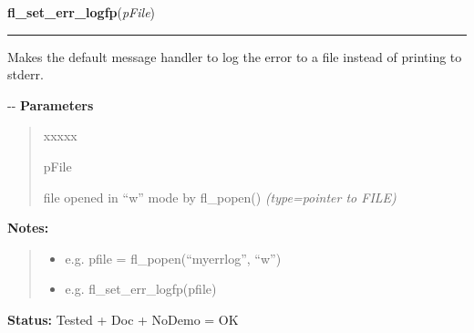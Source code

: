 \hspace{.8\funcindent}\begin{boxedminipage}{\funcwidth}

    \raggedright \textbf{fl\_set\_err\_logfp}(\textit{pFile})

    \vspace{-1.5ex}

    \rule{\textwidth}{0.5\fboxrule}
\setlength{\parskip}{2ex}

Makes the default message handler to log the error to a file instead of
printing to stderr.

-{}-
\setlength{\parskip}{1ex}
      \textbf{Parameters}
      \vspace{-1ex}

      \begin{quote}
        \begin{Ventry}{xxxxx}

          \item[pFile]


file opened in ``w'' mode by fl\_popen()
            {\it (type=pointer to FILE)}

        \end{Ventry}

      \end{quote}

\textbf{Notes:}
\begin{quote}
  \begin{itemize}

  \item
    \setlength{\parskip}{0.6ex}

e.g. pfile = fl\_popen(``myerrlog'', ``w'')


  \item 
e.g. fl\_set\_err\_logfp(pfile)


\end{itemize}

\end{quote}

\textbf{Status:} 
Tested + Doc + NoDemo = OK


    \end{boxedminipage}

    \label{xformslib:flbasic:fl_set_error_handler}

    \vspace{0.5ex}

